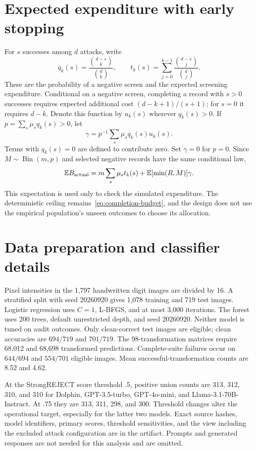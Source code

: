 \documentclass[conference]{IEEEtran}
\newcommand{\E}{\mathbb{E}}
\DeclareMathOperator{\Bin}{Bin}
\begin{document}
\section{Expected expenditure with early stopping}\label{app:cost}
For $s$ successes among $d$ attacks, write
\[
 q_k(s)=\frac{\binom{d-s}{k}}{\binom dk},\qquad
 t_k(s)=\sum_{j=0}^{k-1}\frac{\binom{d-s}{j}}{\binom dj}.
\]
These are the probability of a negative screen and the expected screening expenditure. Conditional on a negative screen, completing a record with $s>0$ successes requires expected additional cost $(d-k+1)/(s+1)$; for $s=0$ it requires $d-k$. Denote this function by $u_k(s)$ wherever $q_k(s)>0$. If $p=\sum_s\mu_s q_k(s)>0$, let
\[
 \gamma=p^{-1}\sum_s\mu_s q_k(s)u_k(s).
\]
Terms with $q_k(s)=0$ are defined to contribute zero. Set $\gamma=0$ for $p=0$. Since $M\sim\Bin(m,p)$ and selected negative records have the same conditional law,
\begin{equation}\label{eq:actual-cost}
 \E B_{\rm actual}=m\sum_s\mu_s t_k(s)+\E[\min(R,M)]\gamma.
\end{equation}
This expectation is used only to check the simulated expenditure. The deterministic ceiling remains~\eqref{eq:completion-budget}, and the design does not use the empirical population's unseen outcomes to choose its allocation.


\section{Data preparation and classifier details}\label{app:data}
Pixel intensities in the 1,797 handwritten digit images are divided by 16. A stratified split with seed 20260920 gives 1,078 training and 719 test images. Logistic regression uses $C=1$, L-BFGS, and at most 3,000 iterations. The forest uses 200 trees, default unrestricted depth, and seed 20260920. Neither model is tuned on audit outcomes. Only clean-correct test images are eligible; clean accuracies are $694/719$ and $701/719$. The 98-transformation matrices require 68,012 and 68,698 transformed predictions. Complete-suite failures occur on $644/694$ and $554/701$ eligible images. Mean successful-transformation counts are 8.52 and 4.62.

At the StrongREJECT score threshold .5, positive union counts are 313, 312, 310, and 310 for Dolphin, GPT-3.5-turbo, GPT-4o-mini, and Llama-3.1-70B-Instruct. At .75 they are 313, 311, 298, and 300. Threshold changes alter the operational target, especially for the latter two models. Exact source hashes, model identifiers, primary scores, threshold sensitivities, and the view including the excluded attack configuration are in the artifact. Prompts and generated responses are not needed for this analysis and are omitted.
\end{document}
